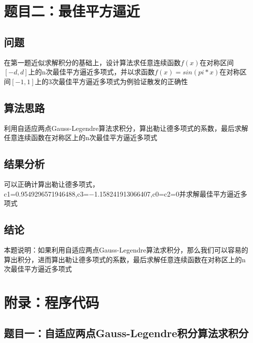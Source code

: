 \documentclass[UTF8,a4paper,11pt]{article}
\begin{document}
\section[题目二]{题目二：最佳平方逼近}

\subsection{问题}
在第一题近似求解积分的基础上，设计算法求任意连续函数$f(x)$在对称区间$[-d,d]$上的n次最佳平方逼近多项式，并以求函数$f(x)=sin(pi*x)$在对称区间$[-1,1]$上的3次最佳平方逼近多项式为例验证散发的正确性


\subsection{算法思路}
利用自适应两点Gauss-Legendre算法求积分，算出勒让德多项式的系数，最后求解任意连续函数在对称区上的n次最佳平方逼近多项式


\subsection{结果分析}
可以正确计算出勒让德多项式，c1=0.9549296571946488,c3=−1.158241913066407,c0=c2=0并求解最佳平方逼近多项式


\subsection{结论}

本题说明：如果利用自适应两点Gauss-Legendre算法求积分，那么我们可以容易的算出积分，进而算出勒让德多项式的系数，最后求解任意连续函数在对称区上的n次最佳平方逼近多项式
\clearpage
\section{附录：程序代码}

\subsection{题目一：自适应两点Gauss-Legendre积分算法求积分}
\end{document}
